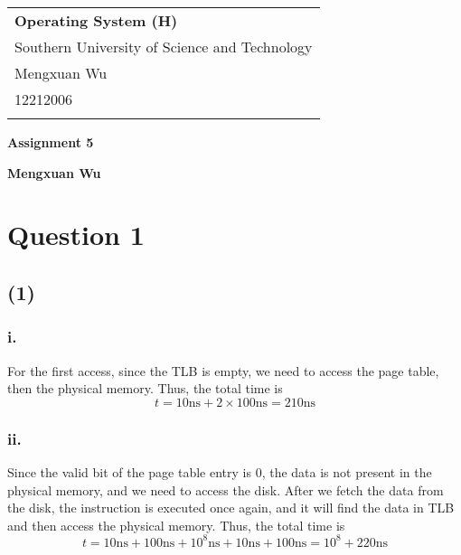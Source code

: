 \documentclass[a4paper,12pt]{article}
\begin{document}
\thispagestyle{empty} %

\begin{tabular}{p{15.5cm}}
{\large \bf Operating System (H)} \\
Southern University of Science and Technology \\ Mengxuan Wu \\ 12212006 \\
\hline
\\
\end{tabular}

\vspace*{0.3cm} %

\begin{center}
	{\Large \bf Assignment 5}
	\vspace{2mm}

	{\bf Mengxuan Wu}
		
\end{center}  

\vspace{0.4cm}

\section*{Question 1}

\subsection*{(1)}

\subsubsection*{i.}

For the first access, since the TLB is empty, we need to access the page table, then the physical memory. Thus, the total time is
\begin{equation*}
	t = 10 \text{ns} + 2 \times 100 \text{ns} = 210 \text{ns}
\end{equation*}

\subsubsection*{ii.}

Since the valid bit of the page table entry is 0, the data is not present in the physical memory, and we need to access the disk. After we fetch the data from the disk, the instruction is executed once again, and it will find the data in TLB and then access the physical memory. Thus, the total time is
\begin{equation*}
	t = 10 \text{ns} + 100 \text{ns} + 10^8 \text{ns} + 10 \text{ns} + 100 \text{ns} = 10^8 + 220 \text{ns}
\end{equation*}
\end{document}
